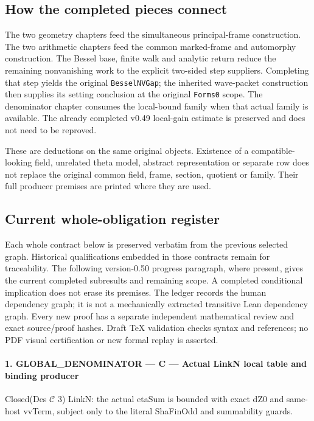 \subsection{How the completed pieces connect}

The two geometry chapters feed the simultaneous principal-frame
construction. The two arithmetic chapters feed the common marked-frame
and automorphy construction. The Bessel base, finite walk and analytic
return reduce the remaining nonvanishing work to the explicit
two-sided step suppliers. Completing that step yields the original
\texttt{Bessel\allowbreak NVGap}; the inherited wave-packet construction then
supplies its setting conclusion at the original \texttt{Forms0} scope.
The denominator chapter consumes the local-bound family when that
actual family is available. The already completed v0.49 local-gain
estimate is preserved and does not need to be reproved.

These are deductions on the same original objects. Existence of a
compatible-looking field, unrelated theta model, abstract representation
or separate row does not replace the original common field, frame,
section, quotient or family. Their full producer premises are printed
where they are used.

\subsection{Current whole-obligation register}

Each whole contract below is preserved verbatim from the previous
selected graph. Historical qualifications embedded in those contracts
remain for traceability. The following version-0.50 progress paragraph,
where present, gives the current completed subresults and remaining
scope. A completed conditional implication does not erase its premises.
The ledger records the human dependency graph; it is not a mechanically
extracted transitive Lean dependency graph. Every new proof has a
separate independent mathematical review and exact source/proof hashes.
Draft TeX validation checks syntax and references; no PDF visual
certification or new formal replay is asserted.

\paragraph{1. GLOBAL\_\allowbreak DENOMINATOR — C — Actual LinkN local table and binding producer}

Closed(Des $\mathcal C$ 3) LinkN: the actual etaSum is bounded with exact dZ0 and same-host vvTerm, subject only to the literal ShaFinOdd and summability guards.


